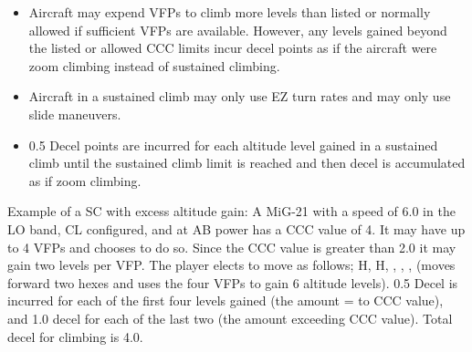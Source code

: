 \begin{itemize}
    \item{} Aircraft may expend VFPs to climb more levels than listed or normally allowed if sufficient VFPs are available. However, any levels gained beyond the listed or allowed CCC limits incur decel points as if the aircraft were zoom climbing instead of sustained climbing.

    \item{} Aircraft in a sustained climb may only use EZ turn rates  and may only use slide maneuvers.

    \item{} 0.5 Decel points are incurred for each altitude level gained in a sustained climb until the sustained climb limit is reached and then decel is accumulated as if zoom climbing. 



\end{itemize}

Example of a SC with excess altitude gain: A MiG-21 with a speed of 6.0 in the LO band, CL configured, and at AB power has a CCC value of 4. It may have up to 4 VFPs and chooses to do so. Since the CCC value is greater than 2.0 it may gain two levels per VFP. The player elects to move as follows; H, H, , , , (moves forward two hexes and uses the four VFPs to gain 6 altitude levels). 0.5 Decel is incurred for each of the first four levels gained (the amount = to CCC value), and 1.0 decel for each of the last two (the amount exceeding CCC value). Total decel for climbing is 4.0.

